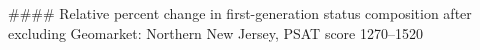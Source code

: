 #### Relative percent change in first-generation status composition after excluding Geomarket: Northern New Jersey, PSAT score 1270–1520
